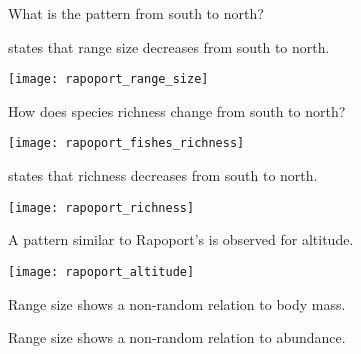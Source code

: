 \documentclass[t]{beamer}
\begin{document}

{
\begin{frame}[b,plain]{What is the pattern from south to north?}

\end{frame}
}




\begin{frame}[t,plain]{ states that range size decreases from south to north.}
	\begin{center}
		\texttt{[image: rapoport\_range\_size]}
	\end{center}

\end{frame}

\begin{frame}[b,plain]{How does species richness change from south to north?}
	\begin{center}
		\texttt{[image: rapoport\_fishes\_richness]}
	\end{center}

\end{frame}

\begin{frame}[t,plain]{ states that richness decreases from south to north.}
	\begin{center}
		\texttt{[image: rapoport\_richness]}
	\end{center}

\end{frame}


\begin{frame}[t,plain]{A pattern similar to Rapoport's is observed for altitude.}
	\begin{center}
		\texttt{[image: rapoport\_altitude]}
	\end{center}
\end{frame}

{
\begin{frame}[b,plain]{Range size shows a non-random relation to body mass.}

\end{frame}
}

{
\begin{frame}[b,plain]{Range size shows a non-random relation to abundance.}

\end{frame}
}
\end{document}
